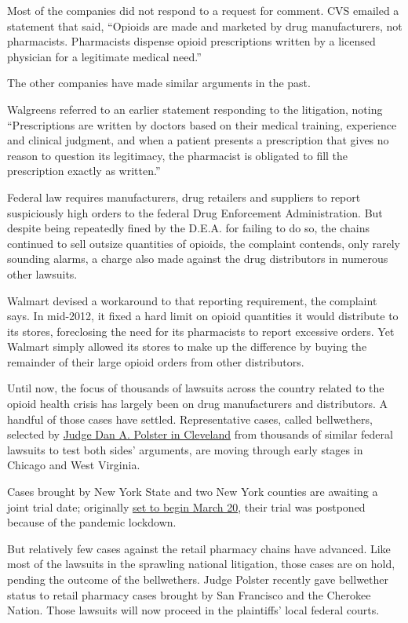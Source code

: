 Most of the companies did not respond to a request for comment. CVS
emailed a statement that said, ``Opioids are made and marketed by drug
manufacturers, not pharmacists. Pharmacists dispense opioid
prescriptions written by a licensed physician for a legitimate medical
need.''

The other companies have made similar arguments in the past.

Walgreens referred to an earlier statement responding to the litigation,
noting ``Prescriptions are written by doctors based on their medical
training, experience and clinical judgment, and when a patient presents
a prescription that gives no reason to question its legitimacy, the
pharmacist is obligated to fill the prescription exactly as written.''

Federal law requires manufacturers, drug retailers and suppliers to
report suspiciously high orders to the federal Drug Enforcement
Administration. But despite being repeatedly fined by the D.E.A. for
failing to do so, the chains continued to sell outsize quantities of
opioids, the complaint contends, only rarely sounding alarms, a charge
also made against the drug distributors in numerous other lawsuits.

Walmart devised a workaround to that reporting requirement, the
complaint says. In mid-2012, it fixed a hard limit on opioid quantities
it would distribute to its stores, foreclosing the need for its
pharmacists to report excessive orders. Yet Walmart simply allowed its
stores to make up the difference by buying the remainder of their large
opioid orders from other distributors.

Until now, the focus of thousands of lawsuits across the country related
to the opioid health crisis has largely been on drug manufacturers and
distributors. A handful of those cases have settled. Representative
cases, called bellwethers, selected by
\href{https://www.nytimes3xbfgragh.onion/2018/03/05/health/opioid-crisis-judge-lawsuits.html}{Judge
Dan A. Polster in Cleveland} from thousands of similar federal lawsuits
to test both sides' arguments, are moving through early stages in
Chicago and West Virginia.

Cases brought by New York State and two New York counties are awaiting a
joint trial date; originally
\href{https://ag.ny.gov/press-release/2020/out-abundance-caution-opioid-trial-delayed-due-coronavirus}{set
to begin March 20}, their trial was postponed because of the pandemic
lockdown.

But relatively few cases against the retail pharmacy chains have
advanced. Like most of the lawsuits in the sprawling national
litigation, those cases are on hold, pending the outcome of the
bellwethers. Judge Polster recently gave bellwether status to retail
pharmacy cases brought by San Francisco and the Cherokee Nation. Those
lawsuits will now proceed in the plaintiffs' local federal courts.

